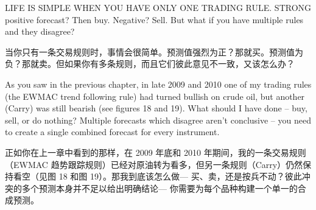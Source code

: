 

\begin{englishblock} LIFE IS SIMPLE WHEN YOU HAVE ONLY ONE TRADING RULE. STRONG positive forecast? Then buy. Negative? Sell. But what if you have multiple rules and they disagree? \end{englishblock}

\begin{chineseblock}当你只有一条交易规则时，事情会很简单。预测值强烈为正？那就买。预测值为负？那就卖。但如果你有多条规则，而且它们彼此意见不一致，又该怎么办？\end{chineseblock}

\bipairgap

\begin{englishblock} As you saw in the previous chapter, in late 2009 and 2010 one of my trading rules (the EWMAC trend following rule) had turned bullish on crude oil, but another (Carry) was still bearish (see figures 18 and 19). What should I have done -- buy, sell, or do nothing? Multiple forecasts which disagree aren't conclusive -- you need to create a single combined forecast for every instrument. \end{englishblock}

\begin{chineseblock}正如你在上一章中看到的那样，在 2009 年底和 2010 年期间，我的一条交易规则（EWMAC 趋势跟踪规则）已经对原油转为看多，但另一条规则（Carry）仍然保持看空（见图 18 和图 19）。那我到底该怎么做--- 买、卖，还是按兵不动？彼此冲突的多个预测本身并不足以给出明确结论--- 你需要为每个品种构建一个单一的合成预测。\end{chineseblock}


